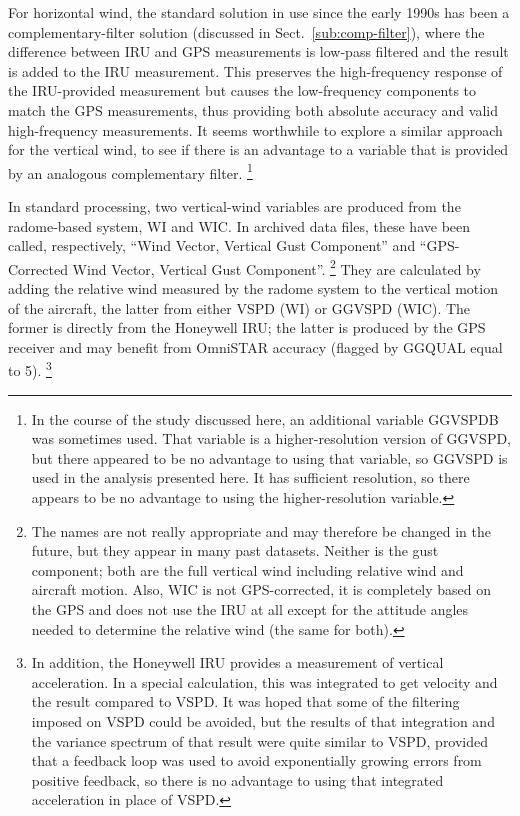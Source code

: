 \documentclass[12pt,twoside,english]{article}\usepackage[]{graphicx}\usepackage[]{color}
\let\OrgIndex\index
\renewcommand*{\index}[1]{\OrgIndex{#1}}
\begin{document}
For horizontal wind, the standard solution in use since the early 1990s has been a complementary-filter solution (discussed in Sect.~\ref{sub:comp-filter}), where the difference between IRU and GPS measurements is low-pass filtered and the result is added to the IRU measurement. This preserves the high-frequency response of the IRU-provided measurement but causes the low-frequency components to match the GPS measurements, thus providing both absolute accuracy and valid high-frequency measurements. It seems worthwhile to explore a similar approach for the vertical wind, to see if there is an advantage to a variable that is provided by an analogous complementary filter.  \footnote{In the course of the study discussed here, an additional variable
GGVSPDB was
sometimes used. That variable is a higher-resolution version of GGVSPD,
but there appeared to be no advantage to using that variable, so GGVSPD
is used in the analysis presented here. It has sufficient resolution,
so there appears to be no advantage to using the higher-resolution
variable.}

In standard processing, two vertical-wind variables are produced from
the radome-based system, WI
and WIC.
In archived data files, these have been called, respectively, ``Wind Vector, Vertical Gust Component''
and ``GPS-Corrected Wind Vector, Vertical Gust Component''.%
\footnote{The names are not really appropriate and may therefore be changed in the future, but they
appear in many past datasets. Neither is the gust component; both
are the full vertical wind including relative wind and aircraft motion.
Also, WIC is not GPS-corrected, it is completely based on the GPS
and does not use the IRU at all except for the attitude angles needed
to determine the relative wind (the same for both).}
They are calculated by adding the relative wind measured by the radome
system to the vertical motion of the aircraft, the latter from either VSPD (WI) or
GGVSPD (WIC). The former is directly from the Honeywell IRU; the latter
is produced by the GPS receiver and may benefit from OmniSTAR accuracy
(flagged by GGQUAL equal to 5).%
\footnote{In addition, the Honeywell IRU provides a measurement of vertical acceleration. In a special calculation, this was integrated to get velocity and the result compared to VSPD. It was hoped that some of the filtering imposed on VSPD could be avoided, but the results of that integration and the variance spectrum of that result were quite similar to VSPD, provided that a feedback loop was used to avoid exponentially growing errors from positive feedback, so there is no advantage to using that integrated acceleration in place of VSPD.}%
\end{document}
